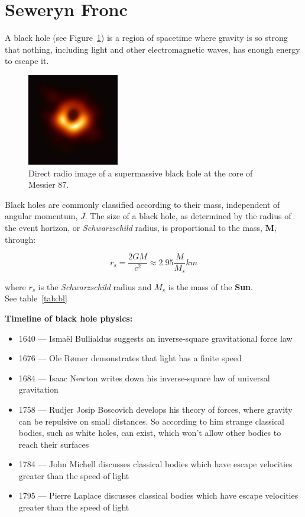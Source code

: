 \section{Seweryn Fronc}
\label{sfronc}
\begin{center}
    A black hole (see Figure~\ref{fig:bl}) is a region of spacetime where gravity is so strong that nothing, including light and other electromagnetic waves, has enough energy to escape it.
\end{center}

\begin{figure}[h]
    \centering
    \includegraphics[width=4cm, height=4cm]{Pictures/bl}
    \caption{Direct radio image of a supermassive black hole at the core of Messier 87.}
    \label{fig:bl}
\end{figure}

\begin{center}    
Black holes are commonly classified according to their mass, independent of angular momentum, \textbf{$J$}. The size of a black hole, as determined by the radius of the event horizon, or \textit{Schwarzschild} radius, is proportional to the mass, \textbf{M}, through: 

$$r_s=\frac{2GM}{c^2} \approx 2.95 \frac{M}{M_s}km$$

where $r_s$ is the \textit{Schwarzschild} radius and $M_s$ is the mass of the \textbf{Sun}.\\
See table~\ref{tab:bl}
\end{center}

\newpage

\hrulefill

\textbf{Timeline of black hole physics:}
\begin{itemize}[label={--}]
  \item 1640 — Ismaël Bullialdus suggests an inverse-square gravitational force law
  \item 1676 — Ole Rømer demonstrates that light has a finite speed
  \item 1684 — Isaac Newton writes down his inverse-square law of universal gravitation
  \item 1758 — Rudjer Josip Boscovich develops his theory of forces, where gravity can be repulsive on small distances. So according to him strange classical bodies, such as white holes, can exist, which won't allow other bodies to reach their surfaces
  \item 1784 — John Michell discusses classical bodies which have escape velocities greater than the speed of light
  \item 1795 — Pierre Laplace discusses classical bodies which have escape velocities greater than the speed of light
\end{itemize}

